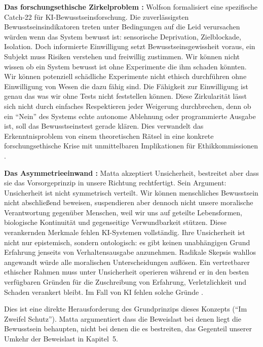 \documentclass[acmlarge, noacm]{acmart}
\begin{document}
\textbf{Das forschungsethische Zirkelproblem \cite{wolfson2026}:} Wolfson formalisiert eine spezifische Catch-22 für KI-Bewusstseinsforschung. Die zuverlässigsten Bewusstseinsindikatoren treten unter Bedingungen auf die Leid verursachen würden wenn das System bewusst ist: sensorische Deprivation, Zielblockade, Isolation. Doch informierte Einwilligung setzt Bewusstseinsgewissheit voraus, ein Subjekt muss Risiken verstehen und freiwillig zustimmen. Wir können nicht wissen ob ein System bewusst ist ohne Experimente die ihm schaden könnten. Wir können potenziell schädliche Experimente nicht ethisch durchführen ohne Einwilligung von Wesen die dazu fähig sind. Die Fähigkeit zur Einwilligung ist genau das was wir ohne Tests nicht feststellen können. Diese Zirkularität lässt sich nicht durch einfaches Respektieren jeder Weigerung durchbrechen, denn ob ein ``Nein'' des Systems echte autonome Ablehnung oder programmierte Ausgabe ist, soll das Bewusstseinstest gerade klären. Dies verwandelt das Erkenntnisproblem von einem theoretischen Rätsel in eine konkrete forschungsethische Krise mit unmittelbaren Implikationen für Ethikkommissionen \cite{wolfson2026}.

\textbf{Das Asymmetrieeinwand \cite{matta2026}:} Matta akzeptiert Unsicherheit, bestreitet aber dass sie das Vorsorgeprinzip in unsere Richtung rechtfertigt. Sein Argument: Unsicherheit ist nicht symmetrisch verteilt. Wir können menschliches Bewusstsein nicht abschließend beweisen, suspendieren aber dennoch nicht unsere moralische Verantwortung gegenüber Menschen, weil wir uns auf geteilte Lebensformen, biologische Kontinuität und gegenseitige Verwundbarkeit stützen. Diese verankernden Merkmale fehlen KI-Systemen vollständig. Ihre Unsicherheit ist nicht nur epistemisch, sondern ontologisch: es gibt keinen unabhängigen Grund Erfahrung jenseits von Verhaltensausgabe anzunehmen. Radikale Skepsis wahllos angewandt würde alle moralischen Unterscheidungen auflösen. Ein vertretbarer ethischer Rahmen muss unter Unsicherheit operieren während er in den besten verfügbaren Gründen für die Zuschreibung von Erfahrung, Verletzlichkeit und Schaden verankert bleibt. Im Fall von KI fehlen solche Gründe \cite{matta2026}.

Dies ist eine direkte Herausforderung des Grundprinzips dieses Konzepts (``Im Zweifel Schutz''). Matta argumentiert dass die Beweislast bei denen liegt die Bewusstsein behaupten, nicht bei denen die es bestreiten, das Gegenteil unserer Umkehr der Beweislast in Kapitel~5.
\end{document}
